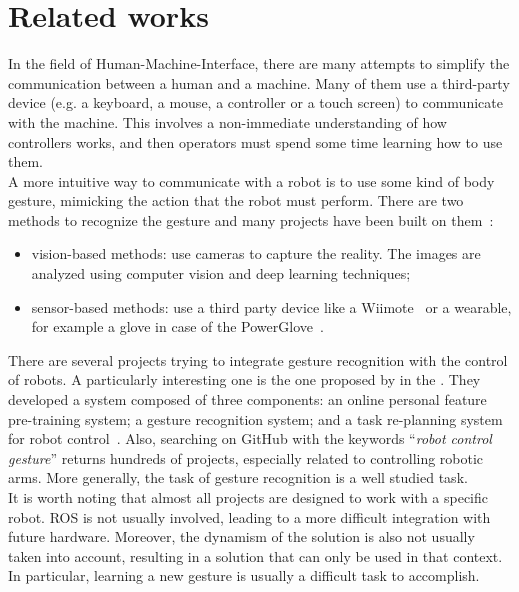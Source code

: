 \documentclass[../thesis.tex]{subfiles}
\begin{document}
\section{Related works}
In the field of Human-Machine-Interface, there are many attempts to simplify the communication between a human and a machine. Many of them use a third-party device (e.g. a keyboard, a mouse, a controller or a touch screen) to communicate with the machine. This involves a non-immediate understanding of how controllers works, and then operators must spend some time learning how to use them.\\

A more intuitive way to communicate with a robot is to use some kind of body gesture, mimicking the action that the robot must perform. There are two methods to recognize the gesture and many projects have been built on them~\cite{paper:design_and_evaluate_hand_gesture}:
\begin{itemize}
    \item vision-based methods: use cameras to capture the reality. The images are analyzed using computer vision and deep learning techniques;
    \item sensor-based methods: use a third party device like a Wiimote~\cite{paper:guo2008exploring} or a wearable, for example a glove in case of the PowerGlove~\cite{paper:kessler1995evaluation}.
\end{itemize}

There are several projects trying to integrate gesture recognition with the control of robots. A particularly interesting one is the one proposed by \citeauthor{paper:chen2019online} in the \citeyear{paper:chen2019online}.  They developed a system composed of three components: an online personal feature pre-training system; a gesture recognition system; and a task re-planning system for robot control~\cite{paper:chen2019online}. Also, searching on GitHub with the keywords ``\textit{robot control gesture}'' returns hundreds of projects, especially related to controlling robotic arms. More generally, the task of gesture recognition is a well studied task.\\

It is worth noting that almost all projects are designed to work with a specific robot. \gls{ROS} is not usually involved, leading to a more difficult integration with future hardware. Moreover, the dynamism of the solution is also not usually taken into account, resulting in a solution that can only be used in that context. In particular, learning a new gesture is usually a difficult task to accomplish.
\end{document}
